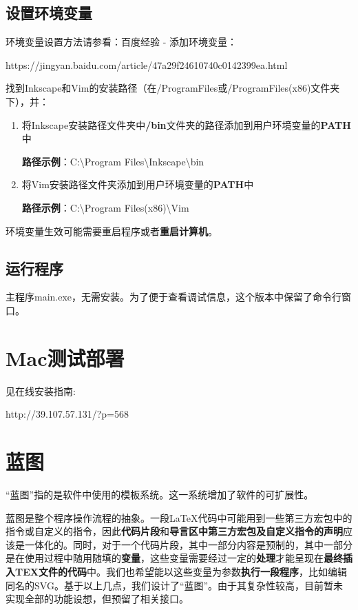 \documentclass[AutoFakeBold,letterpaper,12pt,hidelinks]{article}
\begin{document}
\subsection{设置环境变量}

环境变量设置方法请参看：百度经验 - 添加环境变量：

https://jingyan.baidu.com/article/47a29f24610740c0142399ea.html

找到Inkscape和Vim的安装路径（在/ProgramFiles或/ProgramFiles(x86)文件夹下），并：

\begin{enumerate}
\def\labelenumi{\arabic{enumi}.}
\item
    将Inkscape安装路径文件夹中\textbf{/bin}文件夹的路径添加到用户环境变量的\textbf{PATH}中

    \textbf{路径示例}：C:\textbackslash Program
    Files\textbackslash Inkscape\textbackslash bin
\item
    将Vim安装路径文件夹添加到用户环境变量的\textbf{PATH}中

    \textbf{路径示例}：C:\textbackslash Program
    Files(x86)\textbackslash Vim
\end{enumerate}

环境变量生效可能需要重启程序或者\textbf{重启计算机}。

\subsection{运行程序}

主程序main.exe，无需安装。为了便于查看调试信息，这个版本中保留了命令行窗口。
\section{Mac测试部署}%

见在线安装指南:

http://39.107.57.131/?p=568
\section{蓝图}

``蓝图''指的是软件中使用的模板系统。这一系统增加了软件的可扩展性。

蓝图是整个程序操作流程的抽象。一段LaTeX代码中可能用到一些第三方宏包中的指令或自定义的指令，因此\textbf{代码片段}和\textbf{导言区中第三方宏包及自定义指令的声明}应该是一体化的。同时，对于一个代码片段，其中一部分内容是预制的，其中一部分是在使用过程中随用随填的\textbf{变量}，这些变量需要经过一定的\textbf{处理}才能呈现在\textbf{最终插入TEX文件的代码}中。我们也希望能以这些变量为参数\textbf{执行一段程序}，比如编辑同名的SVG。基于以上几点，我们设计了``蓝图''。由于其复杂性较高，目前暂未实现全部的功能设想，但预留了相关接口。
\end{document}
